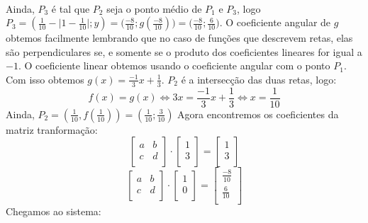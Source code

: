 \documentclass[english,ngerman,parskip=half]{scrartcl}
\newcommand{\abs}[1]{\lvert #1 \rvert}
\begin{document}
\begin{enumerate}
\begin{enumerate}
\begin{tikzpicture}
			\end{tikzpicture} \\
            Ainda, $P_3$ é tal que $P_2$ seja o ponto médio de $P_1$ e $P_3$, 
            logo $P_3 = (\frac{1}{10} - \abs{1-\frac{1}{10}} ; y) = \Big( \frac{-8}{10} ; g(\frac{-8}{10}) \Big) = \Big( \frac{-8}{10} ; \frac{6}{10} \Big)$.
            O coeficiente angular de $g$ obtemos facilmente lembrando que no caso de funções que descrevem retas, 
            elas são perpendiculares se, e somente se o produto dos coeficientes lineares for igual a $-1$. O coeficiente linear obtemos
            usando o coeficiente angular com o ponto $P_1$. Com isso obtemos $g(x) = \frac{-1}{3}x+\frac{1}{3}$. $P_2$ 
            é a intersecção das duas retas, logo:
            \begin{equation}
                f(x) = g(x) \iff
                3x = \frac{-1}{3} x + \frac{1}{3} \iff
                x = \frac{1}{10}
            \end{equation}
            Ainda, $P_2 = (\frac{1}{10}, f(\frac{1}{10}) ) = (\frac{1}{10};\frac{3}{10})$
            Agora encontremos os coeficientes da matriz tranformação:
            \begin{equation}
                \begin{bmatrix}
                a & b \\
                c & d \\
                \end{bmatrix}
                \cdot
                \begin{bmatrix}
                1 \\
                3 \\
                \end{bmatrix}
                =
                \begin{bmatrix}
                1 \\
                3 \\
                \end{bmatrix}
            \end{equation}
            \begin{equation}
                \begin{bmatrix}
                a & b \\
                c & d \\
                \end{bmatrix}
                \cdot
                \begin{bmatrix}
                1 \\
                0 \\
                \end{bmatrix}
                =
                \begin{bmatrix}
                \frac{-8}{10} \\
                \frac{6}{10} \\
                \end{bmatrix}
            \end{equation}
            Chegamos ao sistema:


\end{enumerate}
\end{enumerate}
\end{document}
